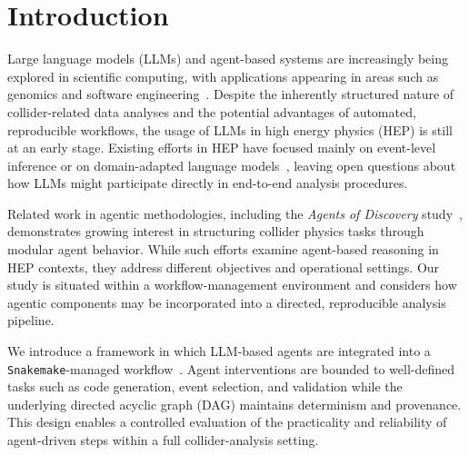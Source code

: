 \documentclass[aps,prd,reprint,superscriptaddress]{revtex4-2}
\begin{document}
\section{Introduction}
Large language models (LLMs) and agent-based systems are increasingly being explored in scientific computing, with applications appearing in areas such as genomics and software engineering~\citep{xiao2024cellagentllmdrivenmultiagentframework,wang2025empiricalresearchutilizingllmbased}. 
Despite the inherently structured nature of collider-related data analyses and the potential advantages of automated, reproducible workflows, the usage of LLMs in high energy physics (HEP) is still at an early stage. 
Existing efforts in HEP have focused mainly on event-level inference or on domain-adapted language models~\citep{richmond2025feyntunelargelanguagemodels,simons2024astrohepbertbidirectionallanguagemodel,wu2024scalingparticlecollisiondata}, leaving open questions about how LLMs might participate directly in end-to-end analysis procedures.

Related work in agentic methodologies, including the \textit{Agents of Discovery} study~\citep{Diefenbacher:2025zzn}, demonstrates growing interest in structuring collider physics tasks through modular agent behavior. While such efforts examine agent-based reasoning in HEP contexts, they address different objectives and operational settings. Our study is situated within a workflow-management environment and considers how agentic components may be incorporated into a directed, reproducible analysis pipeline.

We introduce a framework in which LLM-based agents are integrated into a \texttt{Snakemake}-managed workflow~\citep{molder2021snakemake}. Agent interventions are bounded to well-defined tasks such as code generation, event selection, and validation while the underlying directed acyclic graph (DAG) maintains determinism and provenance. This design enables a controlled evaluation of the practicality and reliability of agent-driven steps within a full collider-analysis setting.

\end{document}

